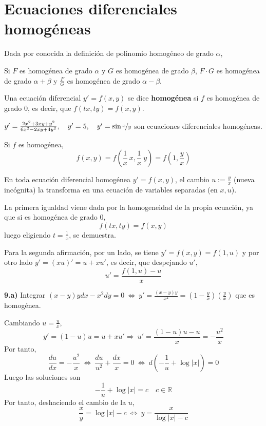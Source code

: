 \section{Ecuaciones diferenciales homogéneas}
Dada por conocida la definición de polinomio homogéneo de grado $\alpha$,
\begin{prop}
Si $F$ es homogénea de grado $\alpha$ y $G$ es homogénea de grado $\beta$, $F \cdot G$ es homogénea de grado $\alpha+\beta$ y $\frac{F}{G}$ es homogénea de grado $\alpha-\beta$.
\end{prop}
\begin{defi}
Una ecuación diferencial $y'=f(x,y)$ se dice \textbf{homogénea} si $f$ es homogénea de grado 0, es decir, que $f(tx,ty)=f(x,y)$.
\end{defi}
\begin{eje}
    $y'=\frac{2x^2+3xy+y^2}{6x^2-2xy+4y^2}, \quad y'=5, \quad y'=\sin\nicefrac{x}{y}$ son ecuaciones diferenciales homogéneas. 
\end{eje}
\begin{prop}
    Si $f$ es homogénea, $$f(x,y)=f\left(\dfrac{1}{x}\: x, \dfrac{1}{x} \: y\right)=f\left(1,\dfrac{y}{x}\right)$$
    
    En toda ecuación diferencial homogénea $y'=f(x,y)$, el cambio $u:=\frac{y}{x}$ (nueva incógnita) la transforma en una ecuación de variables separadas (en $x,u$).
\end{prop}
\begin{dem}
    La primera igualdad viene dada por la homogeneidad de la propia ecuación, ya que si es homogénea de grado 0, 
    $$f(tx,ty)=f(x,y)$$
    luego eligiendo $t=\frac{1}{x}$, se demuestra.
    
    Para la segunda afirmación, por un lado, se tiene $y'=f(x,y)=f(1,u)$ y por otro lado $y'=(xu)'=u+xu'$, es decir, que despejando $u'$,
    $$u'=\dfrac{f(1,u)-u}{x}$$
\end{dem}
\begin{ejer}
    \textbf{9.a)} Integrar $(x-y)ydx-x^2dy=0 \: \iff \: y'=\frac{(x-y)y}{x^2}=\left(1-\frac{y}{x}\right)\left(\frac{y}{x}\right)$ que es homogénea.  

    Cambiando $u=\frac{y}{x}$,
    $$y'=(1-u)u=u+xu' \Rightarrow \: u'=\dfrac{(1-u)u-u}{x}=-\dfrac{u^2}{x}$$
    Por tanto, 
$$\dfrac{du}{dx}=-\dfrac{u^2}{x} \: \iff \: \dfrac{du}{u^2} + \dfrac{dx}{x}=0 \: \iff \: d\left(-\dfrac{1}{u}+\log|x| \right)=0$$
    Luego las soluciones son $$-\dfrac{1}{u}+\log|x|=c \quad c \in \mathbb R$$
    Por tanto, deshaciendo el cambio de la $u$, 
    $$\dfrac{x}{y}=\log|x|-c \: \iff \: y=\dfrac{x}{\log|x|-c}$$
\end{ejer}
